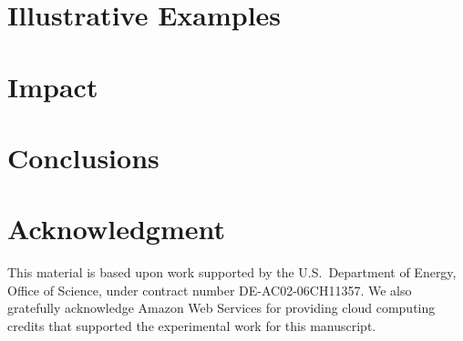 \documentclass[conference]{IEEEtran}
\begin{document}
\section{Illustrative Examples}
\label{sec:illustrative}


\section{Impact}
\label{sec:impact}


\section{Conclusions}
\label{sec:conclusion}






\section*{Acknowledgment}
This material is based upon work supported by the U.S.\ Department of Energy, Office of Science, under contract number DE-AC02-06CH11357. We also gratefully acknowledge Amazon Web Services for providing cloud computing credits that supported the experimental work for this manuscript.



\end{document}
